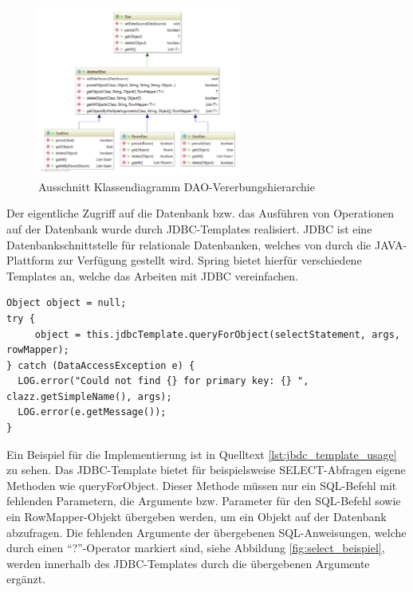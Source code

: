 	\begin{figure}[H]
		\centering 
		\includegraphics[width=0.6\textwidth]{img/dao_klassendia}
		\captionsetup{format=hang}
		\caption[Ausschnitt Klassendiagram DAO-Vererbungshierarchie]{\label{fig:dao_klassendia}Ausschnitt Klassendiagramm \ac{DAO}-Vererbungshierarchie}
	\end{figure}

	Der eigentliche Zugriff auf die Datenbank bzw. das Ausführen von Operationen auf der Datenbank wurde durch \ac{JDBC}-Templates realisiert. \ac{JDBC} ist eine Datenbankschnittstelle für relationale Datenbanken, welches von durch die JAVA-Plattform zur Verfügung gestellt wird. \autocite{WikimediaFoundationInc.2019c} Spring bietet hierfür verschiedene Templates an, welche das Arbeiten mit JDBC vereinfachen.\autocite{PivotalSoftwareInc.b} 
	
\lstset{language=Java}
\begin{lstlisting}[caption={Beispiel JDBC-Template-Verwendung}, label={lst:jbdc_template_usage}]
Object object = null;
try {
     object = this.jdbcTemplate.queryForObject(selectStatement, args, rowMapper);
} catch (DataAccessException e) {
  LOG.error("Could not find {} for primary key: {} ", clazz.getSimpleName(), args);
  LOG.error(e.getMessage());
}
\end{lstlisting}	
	

	Ein Beispiel für die Implementierung ist in Quelltext \ref{lst:jbdc_template_usage} zu sehen. Das \ac{JDBC}-Template bietet für beispielsweise \glqq SELECT\grqq-Abfragen eigene Methoden wie \grqq queryForObject\grqq. Dieser Methode müssen nur ein SQL-Befehl mit fehlenden Parametern, die Argumente bzw. Parameter für den SQL-Befehl sowie ein \glqq RowMapper\grqq-Objekt übergeben werden, um ein Objekt auf der Datenbank abzufragen. Die fehlenden Argumente der übergebenen SQL-Anweisungen, welche durch einen \enquote{?}-Operator markiert sind, siehe Abbildung \ref{fig:select_beispiel}, werden innerhalb des \ac{JDBC}-Templates durch die übergebenen Argumente ergänzt. 

